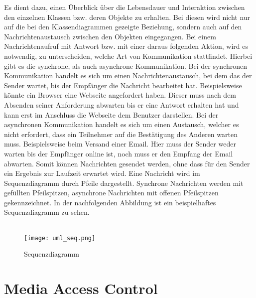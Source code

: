 Es dient dazu, einen Überblick über die Lebensdauer und Interaktion zwischen den einzelnen Klassen bzw. deren Objekte zu erhalten.
Bei diesen wird nicht nur auf die bei den Klassendiagrammen gezeigte Beziehung, sondern auch auf den Nachrichtenaustausch zwischen den Objekten eingegangen.
Bei einem Nachrichtenaufruf mit Antwort bzw. mit einer daraus folgenden Aktion, wird es notwendig, zu unterscheiden, welche Art von Kommunikation stattfindet.
Hierbei gibt es die synchrone, als auch asynchrone Kommunikation.
Bei der synchronen Kommunikation handelt es sich um einen Nachrichtenaustausch, bei dem das der Sender wartet, bis der Empfänger die Nachricht bearbeitet hat.
Beispielsweise könnte ein Browser eine Webseite angefordert haben.
Dieser muss nach dem Absenden seiner Anforderung abwarten bis er eine Antwort erhalten hat und kann erst im Anschluss die Webseite dem Benutzer darstellen.
Bei der asynchronen Kommunikation handelt es sich um einen Austausch, welcher es nicht erfordert, dass ein Teilnehmer auf die Bestätigung des Anderen warten muss. Beispielsweise beim Versand einer Email.
Hier muss der Sender weder warten bis der Empfänger online ist, noch muss er den Empfang der Email abwarten.
Somit können Nachrichten gesendet werden, ohne dass für den Sender ein Ergebnis zur Laufzeit erwartet wird.
Eine Nachricht wird im Sequenzdiagramm durch Pfeile dargestellt. Synchrone Nachrichten werden mit gefüllten Pfeilspitzen, asynchrone Nachrichten mit offenen Pfeilspitzen gekennzeichnet.
In der nachfolgenden Abbildung ist ein beispielhaftes Sequenzdiagramm zu sehen.\\
\\
\begin{figure}[H]
\centering
\texttt{[image: uml\_seq.png]}
\caption{Sequenzdiagramm}
\label{fig:show_s1_s2_p1_n1}
\end{figure}

\section{Media Access Control}
\label{sec:mac}

